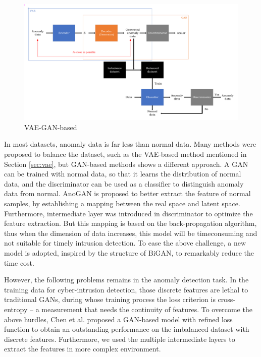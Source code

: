 \documentclass[conference]{IEEEtran}
\begin{document}
\begin{figure}[hbt]
  \centering
  \includegraphics[scale=0.35]{pictures/VAE-GAN-based.pdf}
  \caption{VAE-GAN-based}
  \label{fig:vaegan_base}
  \end{figure}
In most datasets, anomaly data is far less than normal data. Many methods were proposed to balance the dataset, such as the VAE-based method mentioned in Section \ref{sec:vae}, but GAN-based methods shows a different approach. A GAN can be trained with normal data, so that it learns the distribution of normal data, and the discriminator can be used as a classifier to distinguish anomaly data from normal. AnoGAN\cite{schlegl2017unsupervised} is proposed to better extract
the feature of normal samples, by establishing a mapping between
the real space and latent space. Furthermore, intermediate layer
was introduced in discriminator to optimize the feature extraction. But this mapping is based on the back-propagation algorithm, thus when the dimension of data increases, this model will be timeconsuming and not suitable for timely intrusion detection. To ease the above challenge, a new model \cite{zenati2018efficient} is adopted, inspired by the structure of BiGAN\cite{donahue2016adversarial}, to remarkably reduce the time cost.

However, the following problems remains in the anomaly detection
task. In the training data for cyber-intrusion detection, those discrete features are lethal to traditional GANs, during whose training process the loss criterion is cross-entropy -- a measurement that needs the continuity of features. To overcome the above hurdles, Chen et al.\cite{chen2019gan} proposed a GAN-based model with refined loss function to obtain an outstanding performance on the imbalanced dataset with discrete features. Furthermore, we used the multiple intermediate layers to extract the features in more complex environment.
\end{document}
